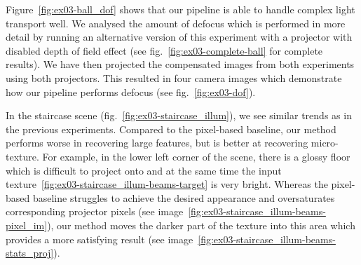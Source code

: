 Figure~\ref{fig:ex03-ball_dof} shows that our pipeline is able to handle complex light transport well. We analysed the amount of defocus which is performed in more detail by running an alternative version of this experiment with a projector with disabled depth of field effect (see fig.~\ref{fig:ex03-complete-ball} for complete results). We have then projected the compensated images from both experiments using both projectors. This resulted in four camera images which demonstrate how our pipeline performs defocus (see fig.~\ref{fig:ex03-dof}).

In the staircase scene (fig.~\ref{fig:ex03-staircase_illum}), we see similar trends as in the previous experiments. Compared to the pixel-based baseline, our method performs worse in recovering large features, but is better at recovering micro-texture. For example, in the lower left corner of the scene, there is a glossy floor which is difficult to project onto and at the same time the input texture~\ref{fig:ex03-staircase_illum-beams-target} is very bright. Whereas the pixel-based baseline struggles to achieve the desired appearance and oversaturates corresponding projector pixels (see image~\ref{fig:ex03-staircase_illum-beams-pixel_im}), our method moves the darker part of the texture into this area which provides a more satisfying result (see image~\ref{fig:ex03-staircase_illum-beams-stats_proj}).